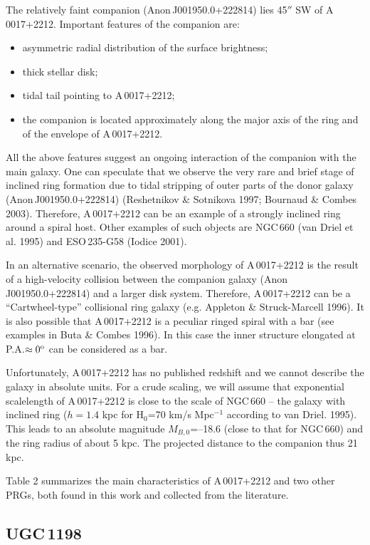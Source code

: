 \documentclass[]{aa}
\begin{document}
The relatively faint companion (Anon\,J001950.0+222814) lies 45$''$ SW of 
A\,0017+2212. Important features of the companion are:
\begin{itemize}
\item asymmetric radial distribution of the surface brightness;
\item thick stellar disk;
\item tidal tail pointing to A\,0017+2212;
\item the companion is located approximately along
the major axis of the ring and of the envelope of A\,0017+2212. 
\end{itemize}
All the above features suggest an ongoing interaction of the companion with
the main galaxy. One can speculate that we observe the very rare and
brief stage of inclined ring formation due to tidal stripping
of outer parts of the donor galaxy (Anon\,J001950.0+222814)
(Reshetnikov \& Sotnikova 1997; Bournaud \& Combes 2003). 
Therefore, A\,0017+2212 can be an example of a strongly inclined ring
around a spiral host. Other examples of such objects are NGC\,660
(van Driel et al. 1995) and ESO\,235-G58 (Iodice 2001). 

In an alternative scenario, the observed morphology of A\,0017+2212
is the result of a high-velocity collision between the companion
galaxy (Anon\,J001950.0+222814) and a larger disk system. Therefore,
A\,0017+2212 can be a ``Cartwheel-type'' collisional ring
galaxy (e.g. Appleton \& Struck-Marcell 1996). It is
also possible that A\,0017+2212 is a peculiar ringed spiral with
a bar (see examples in Buta \& Combes 1996). In this case the
inner structure elongated at P.A.$\approx 0^{\rm o}$ can be considered
as a bar.

Unfortunately, A\,0017+2212 has no published redshift and we cannot
describe the galaxy in absolute units. For a crude scaling, we
will assume that exponential scalelength of A\,0017+2212 is close
to the scale of NGC\,660 -- the galaxy with inclined ring
($h=1.4$ kpc for H$_0$=70 km/s Mpc$^{-1}$ according to van Driel. 1995). 
This leads to an absolute magnitude $M_{B,0}$=--18.6 (close to
that for NGC\,660) and the ring radius of about 5 kpc. The projected
distance to the companion thus 21 kpc. 

Table 2 summarizes the main characteristics of A\,0017+2212 and
two other PRGs, both found in this work and collected from the 
literature.

\subsection{UGC\,1198}
\end{document}
